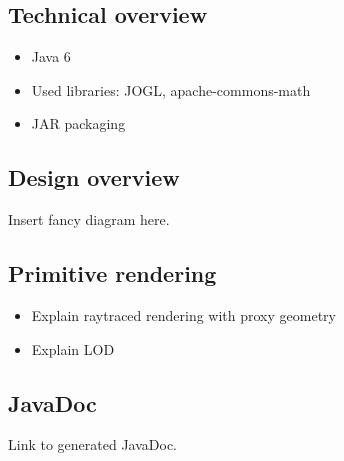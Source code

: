 \documentclass{scrartcl}
\begin{document}
\subsection{Technical overview}

\begin{itemize}
\item Java 6
\item Used libraries: JOGL, apache-commons-math
\item JAR packaging
\end{itemize}

\subsection{Design overview}

Insert fancy diagram here.

\subsection{Primitive rendering}

\begin{itemize}
\item Explain raytraced rendering with proxy geometry
\item Explain LOD
\end{itemize}

\subsection{JavaDoc}

Link to generated JavaDoc.
\end{document}

